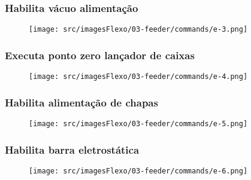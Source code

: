 \subsubsection{\small{Habilita vácuo alimentação}}
\vspace*{\fill}
\begin{figure}[h]
  \centering
  \texttt{[image: src/imagesFlexo/03-feeder/commands/e-3.png]}
\end{figure}
\vspace*{\fill}

\newpage
\thispagestyle{fancy}
\vspace*{40 pt}
\subsubsection{\small{Executa ponto zero lançador de caixas}}
\vspace*{\fill}
\begin{figure}[h]
  \centering
  \texttt{[image: src/imagesFlexo/03-feeder/commands/e-4.png]}
\end{figure}
\vspace*{\fill}

\newpage
\thispagestyle{fancy}
\vspace*{40 pt}
\subsubsection{\small{Habilita alimentação de chapas}}
\vspace*{\fill}
\begin{figure}[h]
  \centering
  \texttt{[image: src/imagesFlexo/03-feeder/commands/e-5.png]}
\end{figure}
\vspace*{\fill}

\newpage
\thispagestyle{fancy}
\vspace*{40 pt}
\subsubsection{\small{Habilita barra eletrostática}}
\vspace*{\fill}
\begin{figure}[h]
  \centering
  \texttt{[image: src/imagesFlexo/03-feeder/commands/e-6.png]}
\end{figure}
\vspace*{\fill}